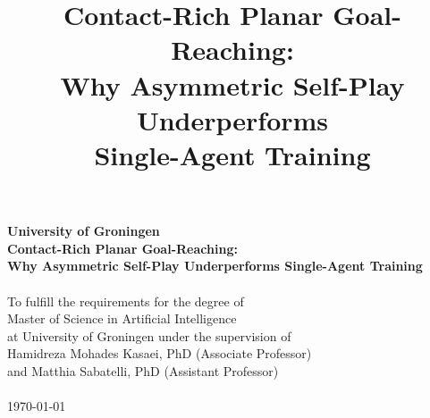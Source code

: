 \documentclass[a4paper,12pt,twoside]{article}
\begin{document}
\pagestyle{body}


\title{
    \vspace{5cm}
        {\bf
        {\Huge Contact-Rich Planar Goal-Reaching:\\
        \vspace{2mm}Why Asymmetric Self-Play Underperforms\\
        \vspace{2mm}Single-Agent Training}
        }\\
        \vspace{9cm}{\LARGE Vlad Iftime}
}
\date{}

\maketitle
\thispagestyle{titlepage}


\newpage

\thispagestyle{titlepage}

\vspace*{4cm}

\begin{center}
    {\bf{\large University of Groningen}}\\
    \vspace{1cm}    {\bf{\large Contact-Rich Planar Goal-Reaching:\\\vspace{1mm}Why Asymmetric Self-Play Underperforms Single-Agent Training}}\\
    \vspace{2cm}{\bf Master's Thesis}\\
    \vspace{0.5cm}To fulfill the requirements for the degree of\\Master of Science in Artificial Intelligence\\
    at University of Groningen under the supervision of\\
    Hamidreza Mohades Kasaei, PhD (Associate Professor)\\
    and Matthia Sabatelli, PhD (Assistant Professor)\\
    \vspace{3cm}{\bf Vlad Iftime (s3426394)}\\
    \vspace{4cm}\today
    
\end{center}

\newpage
\end{document}
